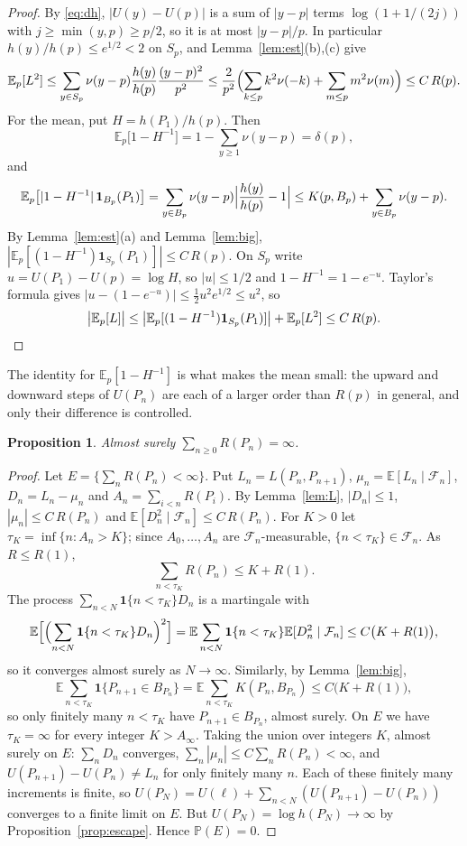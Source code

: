 \documentclass[11pt]{amsart}
\newtheorem{proposition}[theorem]{Proposition}
\theoremstyle{remark}
\numberwithin{equation}{section}
\newcommand{\E}{\mathbb E}
\newcommand{\Pp}{\mathbb P}
\newcommand{\1}{\mathbf 1}
\newcommand{\F}{\mathcal F}
\begin{document}
\begin{proof}
By \eqref{eq:dh}, $|U(y)-U(p)|$ is a sum of $|y-p|$ terms $\log(1+1/(2j))$ with $j\ge\min(y,p)\ge p/2$, so it is at most $|y-p|/p$. In particular $h(y)/h(p)\le e^{1/2}<2$ on $S_p$, and Lemma~\ref{lem:est}(b),(c) give
\[
\E_p[L^2]\le\sum_{y\in S_p}\nu(y-p)\frac{h(y)}{h(p)}\frac{(y-p)^2}{p^2}\le\frac2{p^2}\Bigl(\sum_{k\le p}k^2\nu(-k)+\sum_{m\le p}m^2\nu(m)\Bigr)\le C\,R(p).
\]
For the mean, put $H=h(P_1)/h(p)$. Then
\[
\E_p\bigl[1-H^{-1}\bigr]=1-\sum_{y\ge1}\nu(y-p)=\delta(p),
\]
and
\[
\E_p\bigl[|1-H^{-1}|\,\1_{B_p}(P_1)\bigr]=\sum_{y\in B_p}\nu(y-p)\Bigl|\frac{h(y)}{h(p)}-1\Bigr|\le K(p,B_p)+\sum_{y\in B_p}\nu(y-p).
\]
By Lemma~\ref{lem:est}(a) and Lemma~\ref{lem:big}, $|\E_p[(1-H^{-1})\1_{S_p}(P_1)]|\le C\,R(p)$. On $S_p$ write $u=U(P_1)-U(p)=\log H$, so $|u|\le1/2$ and $1-H^{-1}=1-e^{-u}$. Taylor's formula gives $|u-(1-e^{-u})|\le\frac12u^2e^{1/2}\le u^2$, so
\[
\bigl|\E_p[L]\bigr|\le\bigl|\E_p[(1-H^{-1})\1_{S_p}(P_1)]\bigr|+\E_p[L^2]\le C\,R(p).\qedhere
\]
\end{proof}

The identity for $\E_p[1-H^{-1}]$ is what makes the mean small: the upward and downward steps of $U(P_n)$ are each of a larger order than $R(p)$ in general, and only their difference is controlled.

\begin{proposition}\label{prop:sum}
Almost surely $\sum_{n\ge0}R(P_n)=\infty$.
\end{proposition}

\begin{proof}
Let $E=\{\sum_nR(P_n)<\infty\}$. Put $L_n=L(P_n,P_{n+1})$, $\mu_n=\E[L_n\mid\F_n]$, $D_n=L_n-\mu_n$ and $A_n=\sum_{i<n}R(P_i)$. By Lemma~\ref{lem:L}, $|D_n|\le1$, $|\mu_n|\le C\,R(P_n)$ and $\E[D_n^2\mid\F_n]\le C\,R(P_n)$. For $K>0$ let $\tau_K=\inf\{n:A_n>K\}$; since $A_0,\dots,A_n$ are $\F_n$-measurable, $\{n<\tau_K\}\in\F_n$. As $R\le R(1)$,
\[
\sum_{n<\tau_K}R(P_n)\le K+R(1).
\]
The process $\sum_{n<N}\1\{n<\tau_K\}D_n$ is a martingale with
\[
\E\Bigl[\Bigl(\sum_{n<N}\1\{n<\tau_K\}D_n\Bigr)^2\Bigr]=\E\sum_{n<N}\1\{n<\tau_K\}\E[D_n^2\mid\F_n]\le C\bigl(K+R(1)\bigr),
\]
so it converges almost surely as $N\to\infty$. Similarly, by Lemma~\ref{lem:big},
\[
\E\sum_{n<\tau_K}\1\{P_{n+1}\in B_{P_n}\}=\E\sum_{n<\tau_K}K(P_n,B_{P_n})\le C\bigl(K+R(1)\bigr),
\]
so only finitely many $n<\tau_K$ have $P_{n+1}\in B_{P_n}$, almost surely. On $E$ we have $\tau_K=\infty$ for every integer $K>A_\infty$. Taking the union over integers $K$, almost surely on $E$: $\sum_nD_n$ converges, $\sum_n|\mu_n|\le C\sum_nR(P_n)<\infty$, and $U(P_{n+1})-U(P_n)\ne L_n$ for only finitely many $n$. Each of these finitely many increments is finite, so $U(P_N)=U(\ell)+\sum_{n<N}(U(P_{n+1})-U(P_n))$ converges to a finite limit on $E$. But $U(P_N)=\log h(P_N)\to\infty$ by Proposition~\ref{prop:escape}. Hence $\Pp(E)=0$.
\end{proof}
\end{document}
